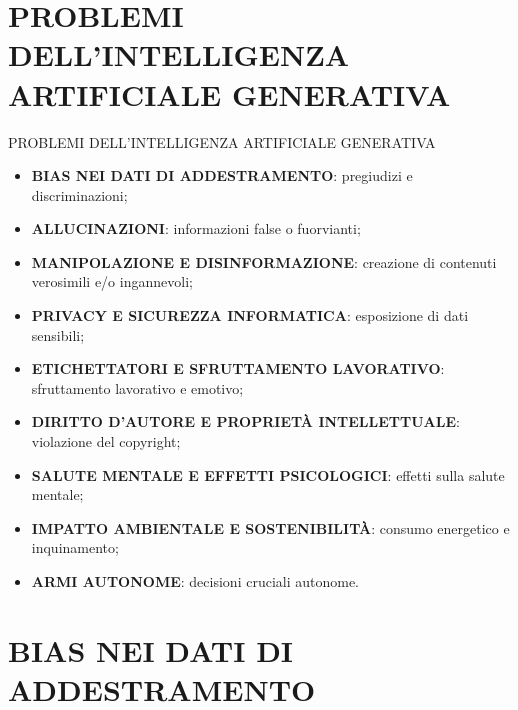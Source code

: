 \documentclass[aspectratio=1610]{beamer}
\begin{document}
\begin{frame}
    \titlepage
\end{frame}

\section{PROBLEMI DELL'INTELLIGENZA ARTIFICIALE GENERATIVA}

\begin{frame}{PROBLEMI DELL'INTELLIGENZA ARTIFICIALE GENERATIVA}
    \begin{itemize}
        \item \textbf{BIAS NEI DATI DI ADDESTRAMENTO}: pregiudizi e discriminazioni;
        \pause
        \item \textbf{ALLUCINAZIONI}: informazioni false o fuorvianti;
        \pause
        \item \textbf{MANIPOLAZIONE E DISINFORMAZIONE}: creazione di contenuti verosimili e/o ingannevoli;
        \pause
        \item \textbf{PRIVACY E SICUREZZA INFORMATICA}: esposizione di dati sensibili;
        \pause
        \item \textbf{ETICHETTATORI E SFRUTTAMENTO LAVORATIVO}: sfruttamento lavorativo e emotivo;
        \pause
        \item \textbf{DIRITTO D'AUTORE E PROPRIETÀ INTELLETTUALE}: violazione del copyright;
        \pause
        \item \textbf{SALUTE MENTALE E EFFETTI PSICOLOGICI}: effetti sulla salute mentale;
        \pause
        \item \textbf{IMPATTO AMBIENTALE E SOSTENIBILITÀ}: consumo energetico e inquinamento;
        \pause
        \item \textbf{ARMI AUTONOME}: decisioni cruciali autonome.
    \end{itemize}
\end{frame}

\section{BIAS NEI DATI DI ADDESTRAMENTO}
\end{document}
